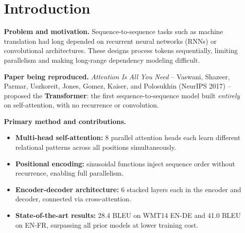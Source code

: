 \documentclass[10pt,twocolumn]{article}
\begin{document}

\section{Introduction}

\textbf{Problem and motivation.}
Sequence-to-sequence tasks such as machine translation had long depended on
recurrent neural networks (RNNs) or convolutional architectures. These designs
process tokens sequentially, limiting parallelism and making long-range
dependency modeling difficult.

\textbf{Paper being reproduced.}
\textit{Attention Is All You Need} -- Vaswani, Shazeer, Parmar, Uszkoreit,
Jones, Gomez, Kaiser, and Polosukhin (NeurIPS 2017) -- proposed the
\textbf{Transformer}: the first sequence-to-sequence model built
\emph{entirely} on self-attention, with no recurrence or convolution.

\textbf{Primary method and contributions.}
\begin{itemize}
  \item \textbf{Multi-head self-attention:} 8 parallel attention heads each
    learn different relational patterns across all positions simultaneously.
  \item \textbf{Positional encoding:} sinusoidal functions inject sequence
    order without recurrence, enabling full parallelism.
  \item \textbf{Encoder-decoder architecture:} 6 stacked layers each in the
    encoder and decoder, connected via cross-attention.
  \item \textbf{State-of-the-art results:} 28.4 BLEU on WMT14 EN-DE and
    41.0 BLEU on EN-FR, surpassing all prior models at lower training cost.
\end{itemize}
\end{document}
